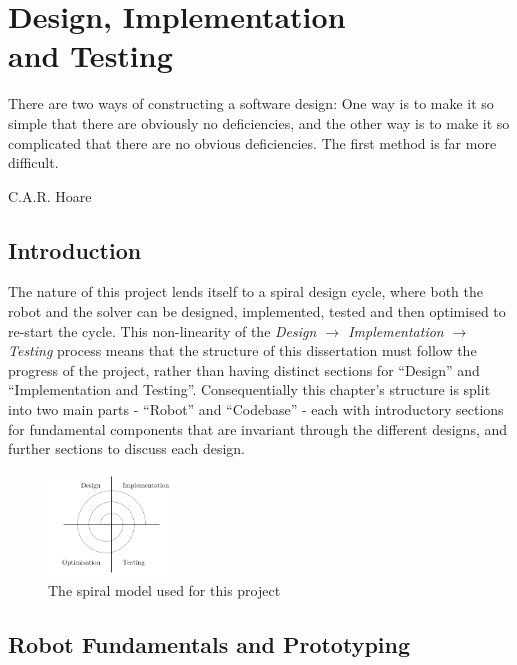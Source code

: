 \documentclass{report}
\newcommand{\tit}[1]{\textit{#1}}
\begin{document}
    \newpage
    
    \chapter[Design, Implementation and Testing]{Design, Implementation \\ and Testing}
    \epigraph{There are two ways of constructing a software design: One way is to make it so simple that there are obviously no deficiencies, and the other way is to make it so complicated that there are no obvious deficiencies. The first method is far more difficult.}{C.A.R. Hoare\cite{Hoare1981}}
    
	\section{Introduction}
	
	The nature of this project lends itself to a spiral design cycle, where both the robot and the solver can be designed, implemented, tested and then optimised to re-start the cycle. This non-linearity of the \tit{Design $\rightarrow$ Implementation $\rightarrow$ Testing} process means that the structure of this dissertation must follow the progress of the project, rather than having distinct sections for \enquote{Design} and \enquote{Implementation and Testing}. Consequentially this chapter's structure is split into two main parts - \enquote{Robot} and \enquote{Codebase} - each with introductory sections for fundamental components that are invariant through the different designs, and further sections to discuss each design.

	\begin{figure}[H]
		\begin{center}
			\includegraphics[width=0.3\textwidth]{Resources/Images/diagSpiralModel.png}
			\caption{The spiral model used for this project}
			\label{fig:diagSpiralModel}
		\end{center}
	\end{figure}

    \section{Robot Fundamentals and Prototyping}
    
\end{document}
